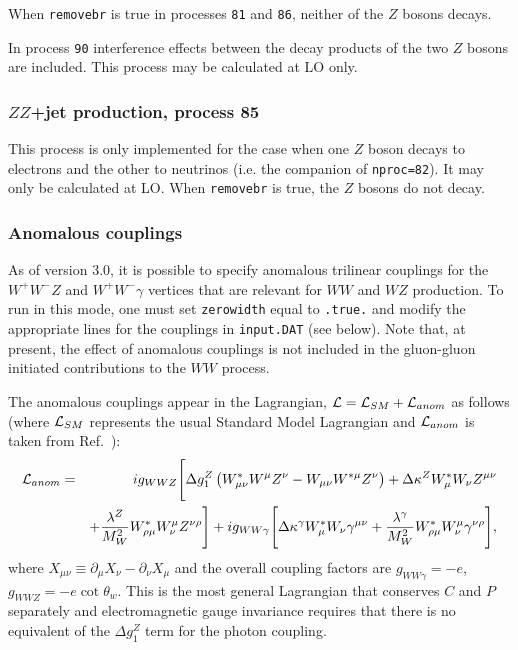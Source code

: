 \documentclass[12pt]{article}
\begin{document}
When {\tt removebr} is true in processes {\tt 81} and {\tt 86},
neither of the $Z$ bosons decays.

In process {\tt 90} interference effects between the decay products of the two $Z$ bosons
are included. This process may be calculated at LO only.

\subsubsection{$ZZ$+jet production, process 85}

This process is only implemented for the case when one $Z$ boson decays to
electrons and the other to neutrinos (i.e. the companion of {\tt nproc=82}).
It may only be calculated at LO. When {\tt removebr} is true, the $Z$ bosons
do not decay.

\subsubsection{Anomalous couplings}

\label{sec:anomalous}
As of version 3.0, it is possible to specify anomalous trilinear
couplings for the $W^+W^-Z$ and $W^+W^-\gamma$ vertices that are
relevant for $WW$ and $WZ$ production. To run in this mode, one
must set {\tt zerowidth} equal to {\tt .true.}
and modify the appropriate lines for the couplings in {\tt input.DAT}
(see below). Note that, at present, the effect of anomalous couplings is not included
in the gluon-gluon initiated contributions to the $WW$ process.

The anomalous couplings appear in the Lagrangian,
${\cal L} = {\cal L}_{SM} + {\cal L}_{anom}$ as follows
(where ${\cal L}_{SM}$ represents the usual Standard Model Lagrangian and
${\cal L}_{anom}$ is taken from Ref.~\cite{Dixon:1999di}):
\begin{eqnarray}
{\cal L}_{anom} & = & i g_{WWZ} \Biggl[
 \Delta g_1^Z \left( W^*_{\mu\nu}W^\mu Z^\nu - W_{\mu\nu}W^{*\mu} Z^\nu \right)
+\Delta\kappa^Z W^*_\mu W_\nu Z^{\mu\nu} \nonumber \\
 & &+
 \frac{\lambda^Z}{M_W^2} W^*_{\rho\mu} W^\mu_\nu Z^{\nu\rho} \Biggr]
+i g_{WW\gamma} \Biggl[ 
 \Delta\kappa^\gamma W^*_\mu W_\nu \gamma^{\mu\nu}
+\frac{\lambda^\gamma}{M_W^2} W^*_{\rho\mu} W^\mu_\nu\gamma^{\nu\rho}
 \Biggr], \nonumber
\end{eqnarray}
where $X_{\mu\nu} \equiv \partial_\mu X_{\nu} - \partial_\nu X_{\mu}$
and the overall coupling factors are $g_{WW\gamma}=-e$,
$g_{WWZ}=-e\cot\theta_w$.
This is the most general Lagrangian that conserves $C$ and $P$
separately and electromagnetic gauge invariance requires that there
is no equivalent of the $\Delta g_1^Z$ term for the photon coupling.
\end{document}

